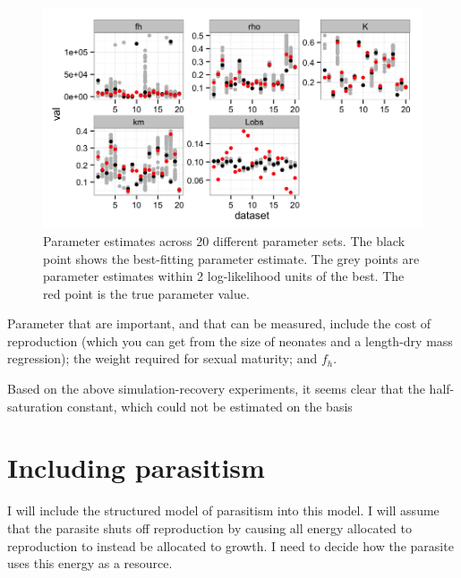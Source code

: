 \documentclass[12pt,reqno,final,pdftex]{amsart}\usepackage[]{graphicx}\usepackage[]{color}
\newenvironment{knitrout}{}{} %
\theoremstyle{plain}
\numberwithin{equation}{part}
\begin{document}
\begin{knitrout}\scriptsize
{}\color{fgcolor}\begin{figure}

\includegraphics[width=\linewidth]{figure/mult-datasets-fitting-2-1} \hfill{}

\caption[Parameter estimates across 20 different parameter sets]{Parameter estimates across 20 different parameter sets. The black point shows the best-fitting parameter estimate. The grey points are parameter estimates within 2 log-likelihood units of the best. The red point is the true parameter value.}\label{fig:mult-datasets-fitting-2}
\end{figure}


\end{knitrout}

Parameter that are important, and that can be measured, include the cost of reproduction (which you can get from the size of neonates and a length-dry mass regression); the weight required for sexual maturity; and $f_h$.



Based on the above simulation-recovery experiments, it seems clear that the half-saturation constant, which could not be estimated on the basis

\clearpage
\section*{Including parasitism}
I will include the structured model of parasitism into this model.
I will assume that the parasite shuts off reproduction by causing all energy allocated to reproduction to instead be allocated to growth.
I need to decide how the parasite uses this energy as a resource.
\end{document}
